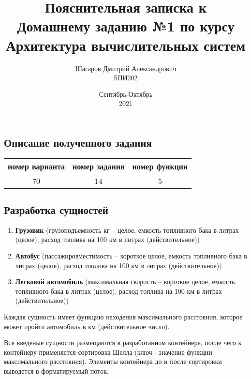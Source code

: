 \documentclass[a4paper]{article}
\title{Пояснительная записка к \\Домашнему заданию №1 по курсу \\Архитектура вычислительных систем}
\date{Сентябрь-Октябрь\\2021}
\author{Шагаров Дмитрий Александрович
\\БПИ202}
\begin{document}
\maketitle
\newpage

\begin{center}
\section*{Описание полученного задания}
\end{center}
\begin{center}
    \begin{tabular}{ |c|c|c| }
        \hline
       номер варианта & номер задания & номер функции \\
        \hline
       70 & 14 & 5 \\
        \hline
    \end{tabular}
\end{center}
\subsection*{Разработка сущностей}
\begin{enumerate} 
    \item \textbf{Грузовик} (грузоподъемность кг – целое, емкость
    топливного
    бака в литрах
    (целое), расход
    топлива на
    100 км в литрах (действительное))
      
    \item \textbf{Автобус} (пассажировместимость – короткое целое, емкость
    топливного
    бака в литрах
    (целое), расход
    топлива на
    100 км в литрах (действительное))

    \item \textbf{Легковой автомобиль} (максимальная скорость –
    короткое целое, емкость
    топливного
    бака в литрах
    (целое), расход
    топлива на
    100 км в литрах (действительное))
\end{enumerate}
Каждая сущность имеет функцию находения максимального
расстояния,
которое может
пройти автомобиль в км
(действительное число).

Все введеные сущности размещаются в разработанном контейнере, после чего к контейнеру применяется сортировка Шелла (ключ - значение функции максимального расстояния). Элементы контейнера до и после сортировки выводется в форматируемый поток.

\newpage
\end{document}
